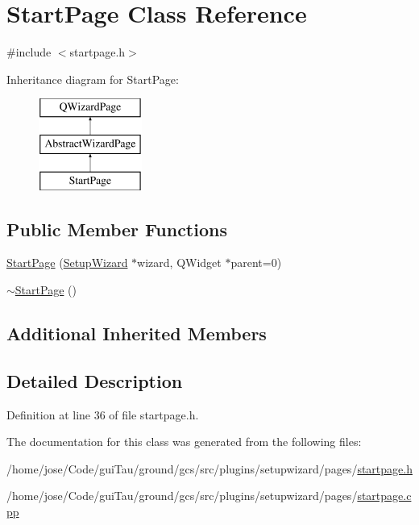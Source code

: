 \hypertarget{class_start_page}{\section{Start\-Page Class Reference}
\label{class_start_page}
}


{\ttfamily \#include $<$startpage.\-h$>$}

Inheritance diagram for Start\-Page\-:\begin{figure}[H]
\begin{center}
\leavevmode
\includegraphics[height=3.000000cm]{class_start_page}
\end{center}
\end{figure}
\subsection*{Public Member Functions}
\begin{DoxyCompactItemize}
\item 
\hyperlink{group___setup_gac7f13cdee5f6c7c47763882247c4dec8}{Start\-Page} (\hyperlink{class_setup_wizard}{Setup\-Wizard} $\ast$wizard, Q\-Widget $\ast$parent=0)
\item 
\hyperlink{group___setup_ga03a08c78d6a2b73a4fe95bfa89e74314}{$\sim$\-Start\-Page} ()
\end{DoxyCompactItemize}
\subsection*{Additional Inherited Members}


\subsection{Detailed Description}


Definition at line 36 of file startpage.\-h.



The documentation for this class was generated from the following files\-:\begin{DoxyCompactItemize}
\item 
/home/jose/\-Code/gui\-Tau/ground/gcs/src/plugins/setupwizard/pages/\hyperlink{startpage_8h}{startpage.\-h}\item 
/home/jose/\-Code/gui\-Tau/ground/gcs/src/plugins/setupwizard/pages/\hyperlink{startpage_8cpp}{startpage.\-cpp}\end{DoxyCompactItemize}
